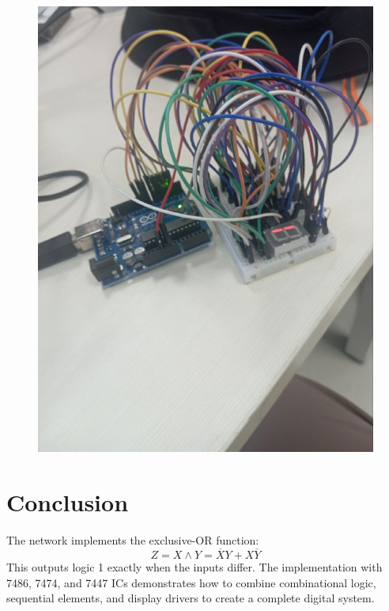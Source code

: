 \documentclass[12pt,a4paper]{article}
\begin{document}
\begin{figure}[H]
\centering
\includegraphics[width=0.8\linewidth]{output.png}
\end{figure}

\section*{Conclusion}
The network implements the exclusive-OR function:
\[
\boxed{Z = X \wedge Y = \overline{X}Y + X\overline{Y}}
\]
This outputs logic 1 exactly when the inputs differ. The implementation with 7486, 7474, and 7447 ICs demonstrates how to combine combinational logic, sequential elements, and display drivers to create a complete digital system.
\end{document}
